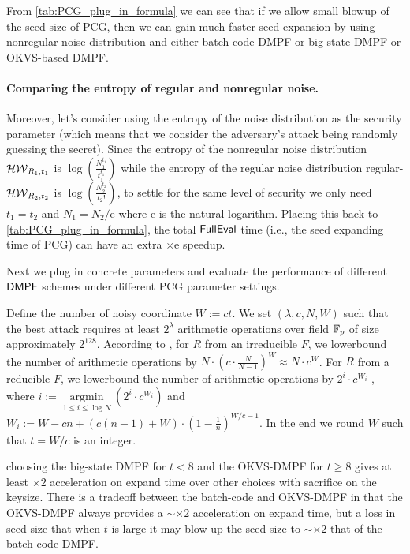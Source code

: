 
From \cref{tab:PCG_plug_in_formula} we can see that if we allow small blowup of the seed size of PCG, then we can gain much faster seed expansion by using nonregular noise distribution and either batch-code DMPF or big-state DMPF or OKVS-based DMPF. 

\paragraph{Comparing the entropy of regular and nonregular noise.}Moreover, let's consider using the entropy of the noise distribution as the security parameter (which means that we consider the adversary's attack being randomly guessing the secret). Since the entropy of the nonregular noise distribution $\mathcal{HW}_{R_1,t_1}$ is $\log(\frac{N_1^{t_1}}{t_1^{t_1}})$ while the entropy of the regular noise distribution regular-$\mathcal{HW}_{R_2,t_2}$ is $\log(\frac{N_2^{t_2}}{t_2!})$, to settle for the same level of security we only need $t_1=t_2$ and $N_1 = N_2/\mathrm{e}$ where $\mathrm{e}$ is the natural logarithm. Placing this back to \cref{tab:PCG_plug_in_formula}, the total ${\sf FullEval}$ time (i.e., the seed expanding time of PCG) can have an extra $\times \mathrm{e}$ speedup. 


Next we plug in concrete parameters and evaluate the performance of different ${\sf DMPF}$ schemes under different PCG parameter settings. 

Define the number of noisy coordinate $W:=ct$. We set $(\lambda, c, N, W)$ such that the best attack requires at least $2^\lambda$ arithmetic operations over field $\mathbb{F}_p$ of size approximately $2^{128}$. According to \cite{cryptoeprint:2022/1035}, for $R$ from an irreducible $F$, we lowerbound the number of arithmetic operations by $N\cdot (c\cdot \frac{N}{N-1})^W\approx N\cdot c^W$.  For $R$ from a reducible $F$, we lowerbound the number of arithmetic operations by $2^i\cdot c^{W_i}$ , where $i:=\mathop{\arg\min}\limits_{1\le i\le \log N}\left(2^i\cdot c^{W_i}\right)$ and $W_i:=W-cn+(c(n-1)+W)\cdot \left(1-\frac{1}{n}\right)^{W/c-1}$. In the end we round $W$ such that $t=W/c$ is an integer. 


 choosing the big-state DMPF for $t<8$ and the OKVS-DMPF for $t\ge 8$ gives at least $\times 2$ acceleration on expand time over other choices with sacrifice on the keysize. There is a tradeoff between the batch-code and OKVS-DMPF in that the OKVS-DMPF always provides a $\sim\times 2$ acceleration on expand time, but a loss in seed size that when $t$ is large it may blow up the seed size to $\sim \times 2$ that of the batch-code-DMPF. 

